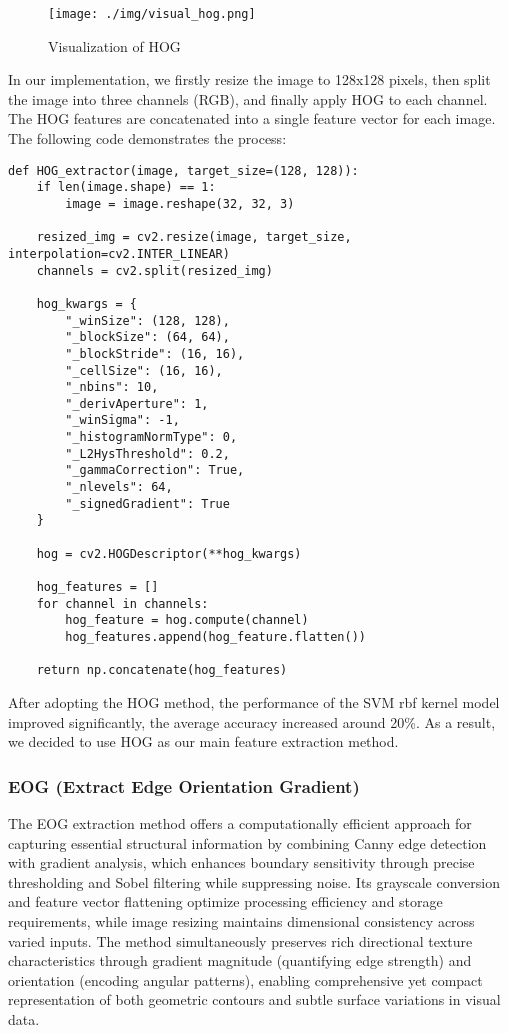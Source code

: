 \documentclass[a4paper,11pt]{article}
\begin{document}
\begin{figure}[H]
    \centering
    \texttt{[image: ./img/visual\_hog.png]}
    \caption[visual_hog] {Visualization of HOG}
\end{figure}

In our implementation, we firstly resize the image to 128x128 pixels, then split the image into three channels (RGB), and finally apply HOG to each channel. The HOG features are concatenated into a single feature vector for each image. The following code demonstrates the process:

\begin{verbatim}
def HOG_extractor(image, target_size=(128, 128)):
    if len(image.shape) == 1:
        image = image.reshape(32, 32, 3) 

    resized_img = cv2.resize(image, target_size, interpolation=cv2.INTER_LINEAR)
    channels = cv2.split(resized_img)
    
    hog_kwargs = {
        "_winSize": (128, 128),
        "_blockSize": (64, 64),
        "_blockStride": (16, 16),
        "_cellSize": (16, 16),
        "_nbins": 10,
        "_derivAperture": 1,
        "_winSigma": -1,
        "_histogramNormType": 0,
        "_L2HysThreshold": 0.2,
        "_gammaCorrection": True,
        "_nlevels": 64,
        "_signedGradient": True
    }   

    hog = cv2.HOGDescriptor(**hog_kwargs)

    hog_features = []
    for channel in channels:
        hog_feature = hog.compute(channel)
        hog_features.append(hog_feature.flatten())

    return np.concatenate(hog_features)
\end{verbatim}

After adopting the HOG method, the performance of the SVM rbf kernel model improved significantly, the average accuracy increased around 20\%.
As a result, we decided to use HOG as our main feature extraction method.

\subsubsection{EOG (Extract Edge Orientation Gradient)}

The EOG extraction method offers a computationally efficient approach for capturing essential structural information by combining Canny edge detection with gradient analysis, which enhances boundary sensitivity through precise thresholding and Sobel filtering while suppressing noise. Its grayscale conversion and feature vector flattening optimize processing efficiency and storage requirements, while image resizing maintains dimensional consistency across varied inputs. The method simultaneously preserves rich directional texture characteristics through gradient magnitude (quantifying edge strength) and orientation (encoding angular patterns), enabling comprehensive yet compact representation of both geometric contours and subtle surface variations in visual data.
\end{document}
